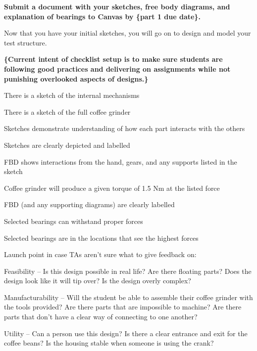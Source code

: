 \documentclass[11pt,letterpaper]{article}
\begin{document}
\textbf{Submit a document with your sketches, free body diagrams, and explanation of bearings to
Canvas by \{part 1 due date\}.}

Now that you have your initial sketches, you will go on to design and model your test structure.

\newpage

\textbf{\{Current intent of checklist setup is to make sure students are following good practices and
delivering on assignments while not punishing overlooked aspects of designs.\}}

\begin{Checklist}
  \item There is a sketch of the internal mechanisms
  \item There is a sketch of the full coffee grinder
  \item Sketches demonstrate understanding of how each part interacts with the others
  \item Sketches are clearly depicted and labelled
  \item FBD shows interactions from the hand, gears, and any supports listed in the sketch
  \item Coffee grinder will produce a given torque of 1.5 Nm at the listed force
  \item FBD (and any supporting diagrams) are clearly labelled
  \item Selected bearings can withstand proper forces
  \item Selected bearings are in the locations that see the highest forces
\end{Checklist}

Launch point in case TAs aren't sure what to give feedback on:
\begin{Checklist}
  \item Feasibility -- Is this design possible in real life? Are there floating parts? Does the design
    look like it will tip over? Is the design overly complex?
  \item Manufacturability -- Will the student be able to assemble their coffee grinder with the tools
    provided? Are there parts that are impossible to machine? Are there parts that don't have a
    clear way of connecting to one another?
  \item Utility -- Can a person use this design? Is there a clear entrance and exit for the coffee beans?
    Is the housing stable when someone is using the crank?
\end{Checklist}
\end{document}
